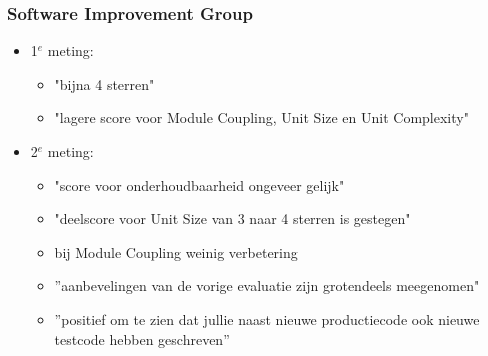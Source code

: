 \begin{frame}\frametitle{Software Improvement Group}
    \hfill
    \begin{itemize}
        \item 1$^e$ meting:
        \begin{itemize}
            \item "bijna 4 sterren"
            \item "lagere score voor Module Coupling, Unit Size en Unit Complexity"
        \end{itemize}
        \item 2$^e$ meting:
            \begin{itemize}
                \item "score voor onderhoudbaarheid ongeveer gelijk"
                \item "deelscore voor Unit Size van 3 naar 4 sterren is gestegen"
                \item bij Module Coupling weinig verbetering
                \item ''aanbevelingen van de vorige evaluatie zijn grotendeels meegenomen"
                \item ''positief om te zien dat jullie naast nieuwe productiecode ook nieuwe testcode hebben geschreven''
            \end{itemize}
    \end{itemize}
\end{frame}
